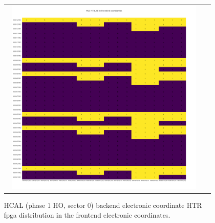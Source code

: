 \begin{figure}[htb]
 \begin{center}
  \begin{tabular}{cc}
   \includegraphics[angle=0,width=0.95\textwidth]{figures/appendix/HO0_HTR_TB_in_FrontEnd.png}
  \end{tabular}
  \caption{HCAL (phase 1 HO, sector 0) backend electronic coordinate HTR fpga distribution in the frontend electronic coordinates.}
  \label{fig:lmapHO0HTRTBFEC}
 \end{center}
\end{figure}
\clearpage


